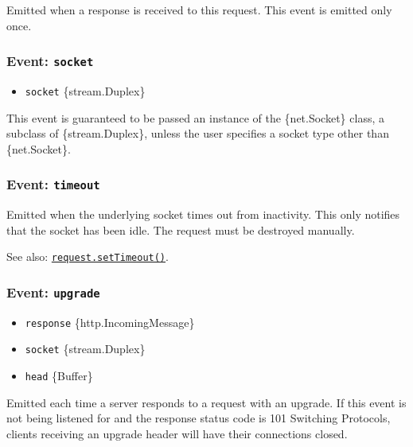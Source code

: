 Emitted when a response is received to this request. This event is
emitted only once.

\subsubsection{\texorpdfstring{Event:
\texttt{\textquotesingle{}socket\textquotesingle{}}}{Event: \textquotesingle socket\textquotesingle{}}}\label{event-socket}

\begin{itemize}
\tightlist
\item
  \texttt{socket} \{stream.Duplex\}
\end{itemize}

This event is guaranteed to be passed an instance of the \{net.Socket\}
class, a subclass of \{stream.Duplex\}, unless the user specifies a
socket type other than \{net.Socket\}.

\subsubsection{\texorpdfstring{Event:
\texttt{\textquotesingle{}timeout\textquotesingle{}}}{Event: \textquotesingle timeout\textquotesingle{}}}\label{event-timeout}

Emitted when the underlying socket times out from inactivity. This only
notifies that the socket has been idle. The request must be destroyed
manually.

See also:
\hyperref[requestsettimeouttimeout-callback]{\texttt{request.setTimeout()}}.

\subsubsection{\texorpdfstring{Event:
\texttt{\textquotesingle{}upgrade\textquotesingle{}}}{Event: \textquotesingle upgrade\textquotesingle{}}}\label{event-upgrade}

\begin{itemize}
\tightlist
\item
  \texttt{response} \{http.IncomingMessage\}
\item
  \texttt{socket} \{stream.Duplex\}
\item
  \texttt{head} \{Buffer\}
\end{itemize}

Emitted each time a server responds to a request with an upgrade. If
this event is not being listened for and the response status code is 101
Switching Protocols, clients receiving an upgrade header will have their
connections closed.

